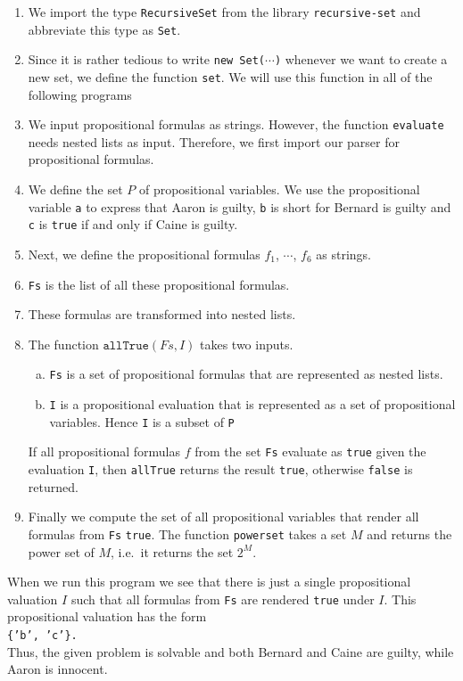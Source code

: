 \begin{enumerate}
\item We import the type \texttt{RecursiveSet} from the library \texttt{recursive-set} and abbreviate
      this type as \texttt{Set}.
\item Since it is rather tedious to write \texttt{new Set($\cdots$)} whenever we want to create a new
      set, we define the function \texttt{set}.  We will use this function in all of the following programs
\item We input propositional formulas as strings.  However, the function \texttt{evaluate} needs nested lists
      as input.  Therefore, we first import our parser for propositional formulas.
\item We define the set $P$ of propositional variables.  We use the propositional variable \texttt{a} to
      express that Aaron is guilty, \texttt{b} is short for Bernard is guilty and \texttt{c} is \texttt{true} if and
      only if Caine is guilty. 
\item Next, we define the propositional formulas $f_1$, $\cdots$, $f_6$ as strings.
\item \texttt{Fs} is the list of all these propositional formulas.
\item These formulas are transformed into nested lists.
\item The function $\texttt{allTrue}(Fs, I)$ takes two inputs.
      \begin{enumerate}[(a)]
      \item \texttt{Fs} is a set of propositional formulas that are represented as nested lists.
      \item \texttt{I} is a propositional evaluation that is represented as a set of propositional variables.
            Hence \texttt{I} is a subset of \texttt{P}
      \end{enumerate}
      If all propositional formulas $f$ from the set \texttt{Fs} evaluate as \texttt{true} given the evaluation
      \texttt{I}, then \texttt{allTrue} returns the result \texttt{true}, otherwise \texttt{false} is returned.
\item Finally we compute the set of all propositional variables that render all formulas from \texttt{Fs} \texttt{true}.
      The function \texttt{powerset} takes a set $M$ and returns the power set of $M$, i.e.~it returns the set $2^M$.
\end{enumerate}
When we run this program we see that there is just a single propositional valuation $I$ such that all formulas
from \texttt{Fs} are rendered \texttt{true} under $I$.  This propositional valuation has the form
\\[0.2cm]
\hspace*{1.3cm}
\texttt{\{'b', 'c'\}.}
\\[0.2cm]
Thus, the given problem is solvable and both Bernard and Caine are guilty, while Aaron is innocent.

